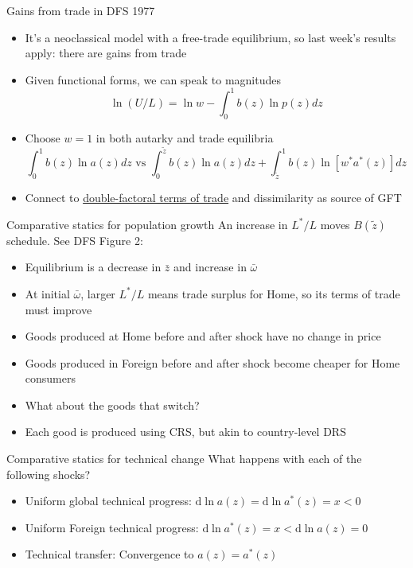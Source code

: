 \documentclass[11pt,notes=hide,aspectratio=169]{beamer}
\begin{document}
\begin{frame}{Gains from trade in DFS 1977}
\begin{itemize}
	\item It's a neoclassical model with a free-trade equilibrium,
	so last week's results apply: there are gains from trade
	\item Given functional forms, we can speak to magnitudes
	\begin{equation*}
		\ln (U/L) = {\ln w} - \int_{0}^{1} b(z) \ln p(z) dz
	\end{equation*}
	\item Choose $w=1$ in both autarky and trade equilibria
	\begin{equation*}
	 \int_{0}^{1} b(z) \ln a(z) dz \text{ vs } \int_{0}^{\tilde{z}} b(z) \ln a(z) dz + \int_{\tilde{z}}^{1} b(z) \ln \left[w^{*} a^{*}(z)\right] dz 
	\end{equation*}
	\item Connect to \href{http://www-personal.umich.edu/~alandear/glossary/d.html\#DoubleFactoralTermsOfTrade}{double-factoral terms of trade} and dissimilarity as source of GFT
\end{itemize}
\end{frame}
\begin{frame}{Comparative statics for population growth}
An increase in $L^{*}/L$ moves $B(\tilde{z})$ schedule. See DFS Figure 2:
\begin{itemize}
	\item Equilibrium is a decrease in $\bar{z}$ and increase in $\bar{\omega}$
	\item At initial $\bar{\omega}$, larger $L^{*}/L$ means trade surplus for Home, so its terms of trade must improve
	\item Goods produced at Home before and after shock have no change in price
	\item Goods produced in Foreign before and after shock become cheaper for Home consumers
	\item What about the goods that switch?
	\item Each good is produced using CRS, but akin to country-level DRS
\end{itemize}
\end{frame}
\begin{frame}{Comparative statics for technical change}
What happens with each of the following shocks?
\begin{itemize}
	\item Uniform global technical progress:  $\textrm{d}\ln a(z) = \textrm{d}\ln a^{*}(z) = x < 0$
	\item Uniform Foreign technical progress: $\textrm{d}\ln a^{*}(z) = x < \textrm{d}\ln a(z) = 0$
	\item Technical transfer: Convergence to $a(z) = a^{*}(z)$
\end{itemize}
\end{frame}
\end{document}

